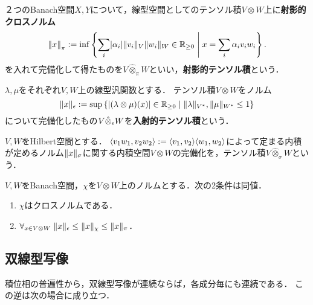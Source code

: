\documentclass[uplatex,dvipdfmx]{jsreport}
\begin{document}
\begin{definition}
    ２つのBanach空間$X,Y$について，線型空間としてのテンソル積$V\otimes W$上に\textbf{射影的クロスノルム}
    \[\left\|x\right\|_\pi:=\inf\left\{\sum_i\lvert\alpha_i\rvert\|v_i\|_V\|w_i\|_W\in\mathbb{R}_{\ge 0}\;\middle|\; x=\sum_i\alpha_iv_iw_i\right\}.\]
    を入れて完備化して得たものを$V\hat{\otimes}_\pi W$といい，\textbf{射影的テンソル積}という．
\end{definition}

\begin{definition}
    $\lambda,\mu$をそれぞれ$V,W$上の線型汎関数とする．
    テンソル積$V\otimes W$をノルム
    \[\|x\|_\epsilon:=\sup\left\{\lvert(\lambda\otimes\mu)(x)\rvert\in\mathbb{R}_{\ge 0}\;\middle|\;\|\lambda\|_{V^*},\|\mu\|_{W^*}\le 1\right\}\]
    について完備化したもの$V\hat{\otimes}_\epsilon W$を\textbf{入射的テンソル積}という．
\end{definition}

\begin{definition}
    $V,W$をHilbert空間とする．
    $\langle v_1w_1,v_2w_2\rangle:=\langle v_1,v_2\rangle\langle w_1,w_2\rangle$によって定まる内積が定めるノルム$\|x\|_\sigma$に関する内積空間$V\otimes W$の完備化を，テンソル積$V\hat{\otimes}_\sigma W$という．
\end{definition}

\begin{proposition}
    $V,W$をBanach空間，$\chi$を$V\otimes W$上のノルムとする．次の2条件は同値．
    \begin{enumerate}
        \item $\chi$はクロスノルムである．
        \item $\forall_{x\in V\otimes W}\;\|x\|_\epsilon\le\|x\|_\chi\le\|x\|_\pi$．
    \end{enumerate}
\end{proposition}

\subsection{双線型写像}

\begin{tcolorbox}[colframe=ForestGreen, colback=ForestGreen!10!white,breakable,colbacktitle=ForestGreen!40!white,coltitle=black,fonttitle=\bfseries\sffamily,
title=]
    積位相の普遍性から，双線型写像が連続ならば，各成分毎にも連続である．
    この逆は次の場合に成り立つ．
\end{tcolorbox}
\end{document}
